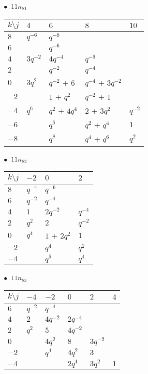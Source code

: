 %
\begin{minipage}{\linewidth}
$\bullet\ $ $11n_{81}$ \vspace{0.5em} \\
\begin{tabular}{l|llll}
$k \setminus j$ & $4$ & $6$ & $8$ & $10$ \\
\hline
$8$ & $q^{-6}$ & $q^{-8}$ &  &  \\
$6$ &  & $q^{-6}$ &  &  \\
$4$ & $3q^{-2}$ & $4q^{-4}$ & $q^{-6}$ &  \\
$2$ &  & $q^{-2}$ & $q^{-4}$ &  \\
$0$ & $3q^{2}$ & $q^{-2}$ + $6$ & $q^{-4}$ + $3q^{-2}$ &  \\
$-2$ &  & $1$ + $q^{2}$ & $q^{-2}$ + $1$ &  \\
$-4$ & $q^{6}$ & $q^{2}$ + $4q^{4}$ & $2$ + $3q^{2}$ & $q^{-2}$ \\
$-6$ &  & $q^{6}$ & $q^{2}$ + $q^{4}$ & $1$ \\
$-8$ &  & $q^{8}$ & $q^{4}$ + $q^{6}$ & $q^{2}$ \\
\end{tabular}
\vspace{2em}
\end{minipage}
%
\begin{minipage}{\linewidth}
$\bullet\ $ $11n_{82}$ \vspace{0.5em} \\
\begin{tabular}{l|lll}
$k \setminus j$ & $-2$ & $0$ & $2$ \\
\hline
$8$ & $q^{-4}$ & $q^{-6}$ &  \\
$6$ & $q^{-2}$ & $q^{-4}$ &  \\
$4$ & $1$ & $2q^{-2}$ & $q^{-4}$ \\
$2$ & $q^{2}$ & $2$ & $q^{-2}$ \\
$0$ & $q^{4}$ & $1$ + $2q^{2}$ & $1$ \\
$-2$ &  & $q^{4}$ & $q^{2}$ \\
$-4$ &  & $q^{6}$ & $q^{4}$ \\
\end{tabular}
\vspace{2em}
\end{minipage}
%
\begin{minipage}{\linewidth}
$\bullet\ $ $11n_{83}$ \vspace{0.5em} \\
\begin{tabular}{l|lllll}
$k \setminus j$ & $-4$ & $-2$ & $0$ & $2$ & $4$ \\
\hline
$6$ & $q^{-2}$ & $q^{-4}$ &  &  &  \\
$4$ & $2$ & $4q^{-2}$ & $2q^{-4}$ &  &  \\
$2$ & $q^{2}$ & $5$ & $4q^{-2}$ &  &  \\
$0$ &  & $4q^{2}$ & $8$ & $3q^{-2}$ &  \\
$-2$ &  & $q^{4}$ & $4q^{2}$ & $3$ &  \\
$-4$ &  &  & $2q^{4}$ & $3q^{2}$ & $1$ \\
\end{tabular}
\vspace{2em}
\end{minipage}
